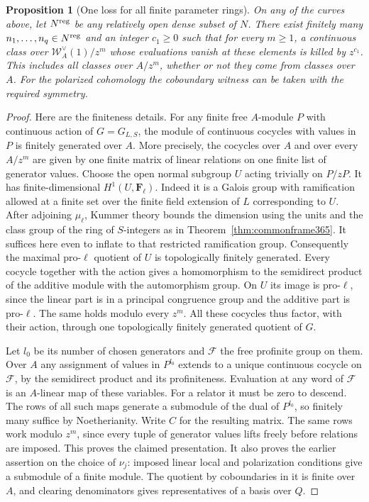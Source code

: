 \documentclass[a4paper,11pt]{article}
\newtheorem{proposition}{Proposition}[section]
\theoremstyle{definition}
\theoremstyle{remark}
\numberwithin{equation}{section}
\begin{document}
\begin{proposition}[One loss for all finite parameter rings]
\label{prop:loss367}
On any of the curves above, let \(N^{\rm reg}\) be any
relatively open dense subset of \(N\). There exist finitely
many \(n_1,\ldots,n_q\in N^{\rm reg}\) and an integer \(c_1\ge0\)
such that for every \(m\ge1\), a continuous class over
\(\mathcal W_A^\vee(1)/z^m\) whose evaluations vanish at these
elements is killed by \(z^{c_1}\). This includes all classes
over \(A/z^m\), whether or not they come from classes over
\(A\). For the polarized cohomology the coboundary witness
can be taken with the required symmetry.
\end{proposition}
\begin{proof}
Here are the finiteness details. For any finite free
\(A\)-module \(P\) with continuous action of \(G=G_{L,S}\),
the module of continuous cocycles with values in \(P\)
is finitely generated over \(A\). More precisely, the
cocycles over \(A\) and over every \(A/z^m\) are given
by one finite matrix of linear relations on one finite
list of generator values. Choose the open normal subgroup
\(U\) acting trivially on \(P/zP\). It has finite-dimensional
\(H^1(U,\mathbf F_\ell)\). Indeed it is a Galois group
with ramification allowed at a finite set over the finite
field extension of \(L\) corresponding to \(U\). After
adjoining \(\mu_\ell\), Kummer theory bounds the dimension
using the units and the class group of the ring of \(S\)-integers
as in Theorem~\ref{thm:commonframe365}. It suffices here
even to inflate to that restricted ramification group.
Consequently the maximal pro-\(\ell\) quotient of \(U\)
is topologically finitely generated. Every cocycle together
with the action gives a homomorphism to the semidirect
product of the additive module with the automorphism group.
On \(U\) its image is pro-\(\ell\), since the linear part
is in a principal congruence group and the additive part
is pro-\(\ell\). The same holds modulo every \(z^m\).
All these cocycles thus factor, with their action, through
one topologically finitely generated quotient of \(G\).

Let \(l_0\) be its number of chosen generators and
\(\mathcal F\) the free profinite group on them. Over \(A\)
any assignment of values in \(P^{l_0}\) extends to a unique
continuous cocycle on \(\mathcal F\), by the semidirect
product and its profiniteness. Evaluation at any word of
\(\mathcal F\) is an \(A\)-linear map of these variables.
For a relator it must be zero to descend. The rows of all
such maps generate a submodule of the dual of \(P^{l_0}\),
so finitely many suffice by Noetherianity. Write \(C\)
for the resulting matrix. The same rows work modulo
\(z^m\), since every tuple of generator values lifts freely
before relations are imposed. This proves the claimed
presentation. It also proves the earlier assertion on the
choice of \(\nu_j\): imposed linear local and polarization
conditions give a submodule of a finite module. The quotient
by coboundaries in it is finite over \(A\), and clearing
denominators gives representatives of a basis over \(Q\).


\end{proof}
\end{document}
